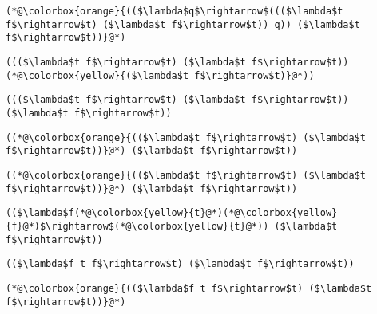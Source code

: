 \documentclass{beamer}
\begin{document}
\begin{frame}[fragile]{\CurrentSection}
\lstset{basicstyle=\ttfamily\small}\lstset{numbers=none}\lstset{language=ML}\begin{lstlisting}
(*@\colorbox{orange}{(($\lambda$q$\rightarrow$((($\lambda$t f$\rightarrow$t) ($\lambda$t f$\rightarrow$t)) q)) ($\lambda$t f$\rightarrow$t))}@*)
\end{lstlisting}
\pause\lstset{language=ML}\begin{lstlisting}
((($\lambda$t f$\rightarrow$t) ($\lambda$t f$\rightarrow$t)) (*@\colorbox{yellow}{($\lambda$t f$\rightarrow$t)}@*))
\end{lstlisting}

\end{frame}

\begin{frame}[fragile]{\CurrentSection}
\lstset{basicstyle=\ttfamily\small}\lstset{numbers=none}\lstset{language=ML}\begin{lstlisting}
((($\lambda$t f$\rightarrow$t) ($\lambda$t f$\rightarrow$t)) ($\lambda$t f$\rightarrow$t))
\end{lstlisting}
\pause\lstset{language=ML}\begin{lstlisting}
((*@\colorbox{orange}{(($\lambda$t f$\rightarrow$t) ($\lambda$t f$\rightarrow$t))}@*) ($\lambda$t f$\rightarrow$t))
\end{lstlisting}

\end{frame}

\begin{frame}[fragile]{\CurrentSection}
\lstset{basicstyle=\ttfamily\small}\lstset{numbers=none}\lstset{language=ML}\begin{lstlisting}
((*@\colorbox{orange}{(($\lambda$t f$\rightarrow$t) ($\lambda$t f$\rightarrow$t))}@*) ($\lambda$t f$\rightarrow$t))
\end{lstlisting}
\pause\lstset{language=ML}\begin{lstlisting}
(($\lambda$f(*@\colorbox{yellow}{t}@*)(*@\colorbox{yellow}{f}@*)$\rightarrow$(*@\colorbox{yellow}{t}@*)) ($\lambda$t f$\rightarrow$t))
\end{lstlisting}

\end{frame}

\begin{frame}[fragile]{\CurrentSection}
\lstset{basicstyle=\ttfamily\small}\lstset{numbers=none}\lstset{language=ML}\begin{lstlisting}
(($\lambda$f t f$\rightarrow$t) ($\lambda$t f$\rightarrow$t))
\end{lstlisting}
\pause\lstset{language=ML}\begin{lstlisting}
(*@\colorbox{orange}{(($\lambda$f t f$\rightarrow$t) ($\lambda$t f$\rightarrow$t))}@*)
\end{lstlisting}

\end{frame}
\end{document}
